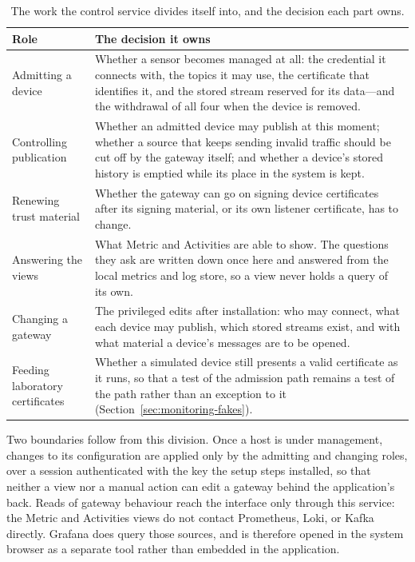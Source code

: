 \documentclass[12pt,a4paper]{report}
\begin{document}
\begin{table}[H]
\centering
{\small
\begin{tabularx}{\textwidth}{@{}p{3.4cm}Y@{}}
\toprule
\textbf{Role} & \textbf{The decision it owns} \\
\midrule
Admitting a device &
Whether a sensor becomes managed at all: the credential it
connects with, the topics it may use, the certificate that
identifies it, and the stored stream reserved for its data---and the
withdrawal of all four when the device is removed. \\
\midrule
Controlling publication &
Whether an admitted device may publish at this moment; whether a
source that keeps sending invalid traffic should be cut off by the
gateway itself; and whether a device's stored history is emptied
while its place in the system is kept. \\
\midrule
Renewing trust material &
Whether the gateway can go on signing device certificates after its
signing material, or its own listener certificate, has to change. \\
\midrule
Answering the views &
What Metric and Activities are able to show. The questions they ask
are written down once here and answered from the local metrics and
log store, so a view never holds a query of its own. \\
\midrule
Changing a gateway &
The privileged edits after installation: who may connect, what each
device may publish, which stored streams exist, and with what
material a device's messages are to be opened. \\
\midrule
Feeding laboratory certificates &
Whether a simulated device still presents a valid certificate as it
runs, so that a test of the admission path remains a test of the path
rather than an exception to it
(Section~\ref{sec:monitoring-fakes}). \\
\bottomrule
\end{tabularx}}
\caption{The work the control service divides itself into, and the
decision each part owns.}
\label{tab:mon-modules}
\end{table}

Two boundaries follow from this division. Once a host is under
management, changes to its configuration are applied only by the
admitting and changing roles, over a session authenticated with the
key the setup steps installed, so that neither a view nor a manual
action can edit a gateway behind the application's back. Reads of
gateway behaviour reach the interface only through this service: the
Metric and Activities views do not contact Prometheus, Loki, or Kafka
directly. Grafana does query those sources, and is therefore opened
in the system browser as a separate tool rather than embedded in the
application.
\end{document}
